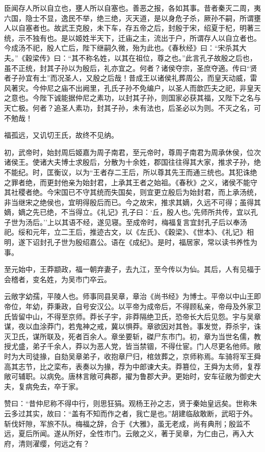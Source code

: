 \documentclass[]{article}
\begin{document}
臣闻存人所以自立也，壅人所以自塞也。善恶之报，各如其事。昔者秦灭二周，夷六国，隐士不显，逸民不举，绝三绝，灭天道，是以身危子杀，厥孙不嗣，所谓壅人以自塞者也。故武王克殷，未下车，存五帝之后，封殷于宋，绍夏于杞，明著三统，示不独有也。是以姬姓半天下，迁庙之主，流出于户，所谓存人以自立者也。今成汤不祀，殷人亡后，陛下继嗣久微，殆为此也。《春秋经》曰：``宋杀其大夫。''《穀梁传》曰：``其不称名姓，以其在祖位，尊之也。''此言孔子故殷之后也，虽不正统，封其子孙以为殷后，礼亦宜之。何者？诸侯夺宗，圣庶夺適。传曰``贤者子孙宜有土''而况圣人，又殷之后哉！昔成王以诸侯礼葬周公，而皇天动威，雷风著灾。今仲尼之庙不出阙里，孔氏子孙不免编户，以圣人而歆匹夫之祀，非皇天之意也。今陛下诚能据仲尼之素功，以封其子孙，则国家必获其福，又陛下之名与天亡极。何者？追圣人素功，封其子孙，未有法也，后圣必以为则。不灭之名，可不勉哉！

福孤远，又讥切王氏，故终不见纳。

初，武帝时，始封周后姬嘉为周子南君，至元帝时，尊周子南君为周承休侯，位次诸侯王。使诸大夫博士求殷后，分散为十余姓，郡国往往得其大家，推求子孙，绝不能纪。时，匡衡议，以为``王者存二王后，所以尊其先王而通三统也。其犯诛绝之罪者绝，而更封他亲为始封君，上承其王者之始祖。《春秋》之义，诸侯不能守其社稷者绝。今宋国已不守其统而失国矣，则宜更立殷后为始封君，而上承汤统，非当继宋之绝侯也，宜明得殷后而已。今之故宋，推求其嫡，久远不可得；虽得其嫡，嫡之先已绝，不当得立。《礼记》孔子曰：`丘，殷人也。'先师所共传，宜以孔子世为汤后。''上以其语不经，遂见寝。至成帝时，梅福复言宜封孔子后以奉汤祀。绥和元年，立二王后，推迹古文，以《左氏》、《穀梁》、《世本》、《礼记》相明，遂下诏封孔子世为殷绍嘉公。语在《成纪》。是时，福居家，常以读书养性为事。

至元始中，王莽颛政，福一朝弃妻子，去九江，至今传以为仙。其后，人有见福于会稽者，变名姓，为吴市门卒云。

云敞字幼孺，平陵人也。师事同县吴章，章治《尚书经》为博士。平帝以中山王即帝位，年幼，莽秉政，自号安汉公。以平帝为成帝后，不得顾私亲，帝母及外家卫氏皆留中山，不得至京师。莽长子宇，非莽隔绝卫氏，恐帝长大后见怨。宇与吴章谋，夜以血涂莽门，若鬼神之戒，冀以惧莽。章欲因对其咎。事发觉，莽杀宇，诛灭卫氏，谋所联及，死者百余人。章坐要斩，磔尸东市门。初，章为当世名儒，教授尤盛，弟子千余人，莽以为恶人党，皆当禁锢，不得仕宦。门人尽更名他师。敞时为大司徒掾，自劾吴章弟子，收抱章尸归，棺敛葬之，京师称焉。车骑将军王舜高其志节，比之栾布，表奏以为掾，荐为中郎谏大夫。莽篡位，王舜为太师，复荐敞可辅职。以病免。唐林言敞可典郡，擢为鲁郡大尹。更始时，安车征敞为御史大夫，复病免去，卒于家。

赞曰：``昔仲尼称不得中行，则思狂狷。观杨王孙之志，贤于秦始皇远矣。世称朱云多过其实，故曰：``盖有不知而作之者，我亡是也。''胡建临敌敢断，武昭于外。斩伐奸隙，军旅不队。梅福之辞，合于《大雅》，虽无老成，尚有典刑；殷监不远，夏后所闻。遂从所好，全性市门。云敞之义，著于吴章，为仁由己，再入大府，清则濯缨，何远之有？
\end{document}
